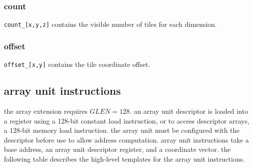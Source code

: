 \begin{samepage}
\subsubsection{count}

\texttt{count\_[x,y,z]} contains the visible number of tiles for each dimension.
\\
\end{samepage}

\begin{samepage}
\subsubsection{offset}

\texttt{offset\_[x,y]} contains the tile coordinate offset.
\\
\end{samepage}

\newpage
\subsection{array unit instructions}

the array extension requires $\mathit{GLEN}=128$. an array unit descriptor is
loaded into a register using a 128-bit constant load instruction, or to access
descriptor arrays, a 128-bit memory load instruction. the array unit must be
configured with the descriptor before use to allow address computation.
array unit instructions take a base address, an array unit descriptor
register, and a coordinate vector. the following table describes
the high-level templates for the array unit instructions.

